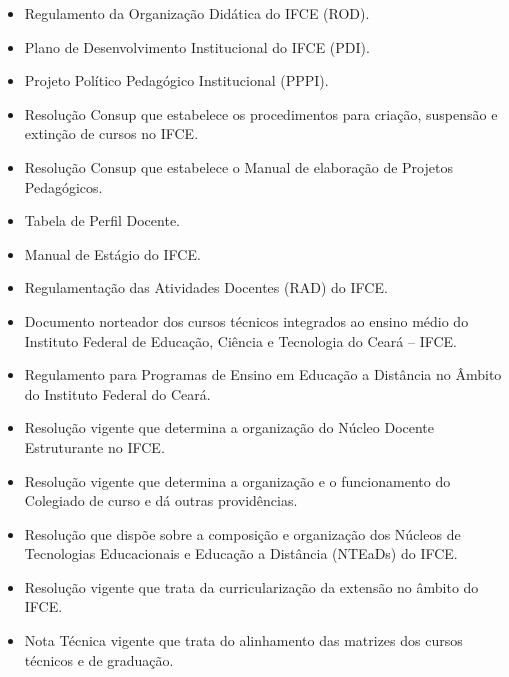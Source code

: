\documentclass[
	12pt,				%
	openright,			%
	twoside,			%
	a4paper,			%
	chapter=TITLE,		%
	english,			%
	french,				%
	spanish,			%
	brazil,				%
	]{abntex2}
\begin{document}
\begin{itemize}
    
   \item Regulamento da Organização Didática do IFCE (ROD).

   \item Plano de Desenvolvimento Institucional do IFCE (PDI).

   \item Projeto Político Pedagógico Institucional (PPPI).

   \item Resolução Consup que estabelece os procedimentos para criação, suspensão e extinção de cursos no IFCE.

   \item Resolução Consup que estabelece o Manual de elaboração de Projetos Pedagógicos.

   \item Tabela de Perfil Docente.

   \item Manual de Estágio do IFCE.

   \item Regulamentação das Atividades Docentes (RAD) do IFCE.

   \item Documento norteador dos cursos técnicos integrados ao ensino médio do Instituto Federal de Educação, Ciência e Tecnologia do Ceará – IFCE.

   \item Regulamento para Programas de Ensino em Educação a Distância no Âmbito do Instituto Federal do Ceará.

   \item Resolução vigente que determina a organização do Núcleo Docente Estruturante no IFCE.

   \item Resolução vigente que determina a organização e o funcionamento do Colegiado de curso e dá outras providências.

   \item Resolução que dispõe sobre a composição e organização dos Núcleos de Tecnologias Educacionais e Educação a Distância (NTEaDs) do IFCE.

   \item Resolução vigente que trata da curricularização da extensão no âmbito do IFCE.

   \item Nota Técnica vigente que trata do alinhamento das matrizes dos cursos técnicos e de graduação.
\end{itemize}
\end{document}

